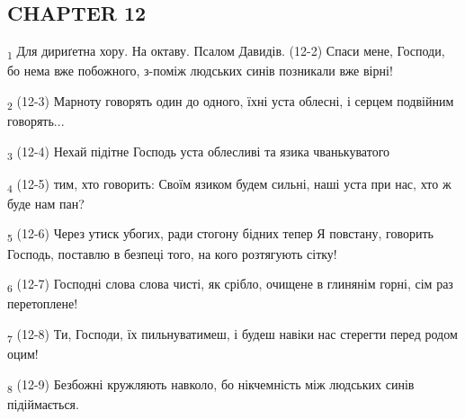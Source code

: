 \subsection{CHAPTER 12}
\begin{tcolorbox}
\textsubscript{1} Для дириґетна хору. На октаву. Псалом Давидів. (12-2) Спаси мене, Господи, бо нема вже побожного, з-поміж людських синів позникали вже вірні!
\end{tcolorbox}
\begin{tcolorbox}
\textsubscript{2} (12-3) Марноту говорять один до одного, їхні уста облесні, і серцем подвійним говорять...
\end{tcolorbox}
\begin{tcolorbox}
\textsubscript{3} (12-4) Нехай підітне Господь уста облесливі та язика чванькуватого
\end{tcolorbox}
\begin{tcolorbox}
\textsubscript{4} (12-5) тим, хто говорить: Своїм язиком будем сильні, наші уста при нас, хто ж буде нам пан?
\end{tcolorbox}
\begin{tcolorbox}
\textsubscript{5} (12-6) Через утиск убогих, ради стогону бідних тепер Я повстану, говорить Господь, поставлю в безпеці того, на кого розтягують сітку!
\end{tcolorbox}
\begin{tcolorbox}
\textsubscript{6} (12-7) Господні слова слова чисті, як срібло, очищене в глинянім горні, сім раз перетоплене!
\end{tcolorbox}
\begin{tcolorbox}
\textsubscript{7} (12-8) Ти, Господи, їх пильнуватимеш, і будеш навіки нас стерегти перед родом оцим!
\end{tcolorbox}
\begin{tcolorbox}
\textsubscript{8} (12-9) Безбожні кружляють навколо, бо нікчемність між людських синів підіймається.
\end{tcolorbox}

